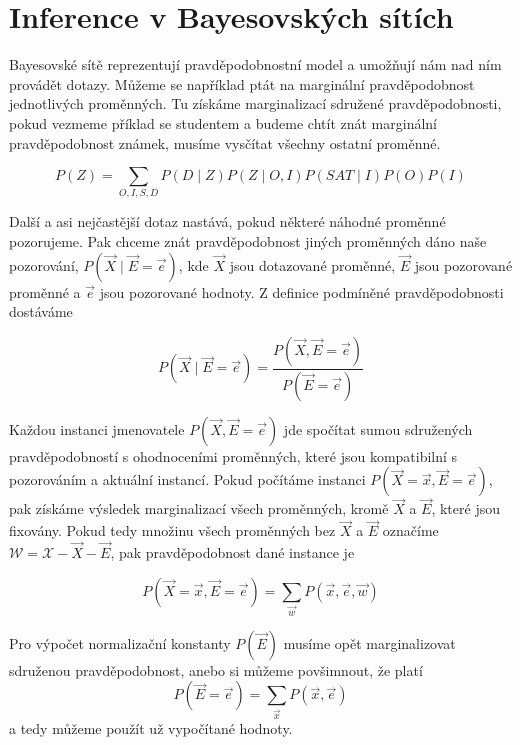 \section{Inference v Bayesovských sítích}

Bayesovské sítě reprezentují pravděpodobnostní model a umožňují nám nad ním provádět dotazy.
Můžeme se například ptát na marginální pravděpodobnost jednotlivých proměnných. 
Tu získáme marginalizací sdružené pravděpodobnosti, pokud vezmeme příklad se studentem a budeme chtít znát marginální pravděpodobnost známek, musíme vysčítat všechny ostatní proměnné.

\begin{equation}
P(Z) = \sum_{O, I, S, D} P(D \mid Z) P(Z \mid O, I) P(SAT \mid I) P(O) P(I)
\end{equation}

Další a asi nejčastější dotaz nastává, pokud některé náhodné proměnné pozorujeme. 
Pak chceme znát pravděpodobnost jiných proměnných dáno naše pozorování, $P(\vec{X} \mid \vec{E} = \vec{e})$, kde $\vec{X}$ jsou dotazované proměnné, $\vec{E}$ jsou pozorované proměnné a $\vec{e}$ jsou pozorované hodnoty.
Z definice podmíněné pravděpodobnosti dostáváme

\begin{equation}
P(\vec{X} \mid \vec{E} = \vec{e}) = \frac{P(\vec{X}, \vec{E} = \vec{e})}{P(\vec{E} = \vec{e})}
\end{equation}

Každou instanci jmenovatele $P(\vec{X}, \vec{E} = \vec{e})$ jde spočítat sumou sdružených pravděpodobností s ohodnoceními proměnných, které jsou kompatibilní s pozorováním a aktuální instancí. 
Pokud počítáme instanci $P(\vec{X} = \vec{x}, \vec{E} = \vec{e})$, pak získáme výsledek marginalizací všech proměnných, kromě $\vec{X}$ a $\vec{E}$, které jsou fixovány.
Pokud tedy množinu všech proměnných bez $\vec{X}$ a $\vec{E}$ označíme $\mathcal{W} = \mathcal{X} - \vec{X} - \vec{E}$, pak pravděpodobnost dané instance je

\begin{equation}
P(\vec{X} = \vec{x}, \vec{E} = \vec{e}) = \sum_{\vec{w}} P(\vec{x}, \vec{e}, \vec{w})
\end{equation}

Pro výpočet normalizační konstanty $P(\vec{E})$ musíme opět marginalizovat sdruženou pravděpodobnost, anebo si můžeme povšimnout, že platí
\begin{equation}
P(\vec{E} = \vec{e}) = \sum_{\vec{x}} P(\vec{x}, \vec{e})
\end{equation}
a tedy můžeme použít už vypočítané hodnoty.

